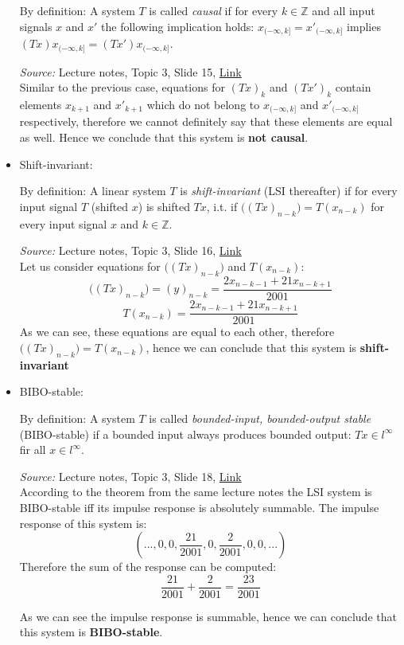\documentclass{article}
\begin{document}
\begin{itemize}
    By definition: A system $T$ is called \emph{causal} if for every $k\in \mathbb{Z}$ and all input signals $x$ and $x'$ the following implication holds: $x_{(-\infty,k]}=x'_{(-\infty,k]}$ implies $(Tx)x_{(-\infty,k]}=(Tx')x_{(-\infty,k]}$.
    
    \emph{Source:} Lecture notes, Topic 3, Slide 15, \href{https://moodle.innopolis.university/pluginfile.php/142933/mod_resource/content/1/DSPt3spr22.pdf}{Link}\\
    
    Similar to the previous case, equations for $(Tx)_k$ and $(Tx')_k$ contain elements $x_{k+1}$ and $x'_{k+1}$ which do not belong to $x_{(-\infty,k]}$ and $x'_{(-\infty,k]}$ respectively, therefore we cannot definitely say that these elements are equal as well. Hence we conclude that this system is \textbf{not causal}.
    
    \item Shift-invariant:
    
    By definition: A linear system $T$ is \emph{shift-invariant} (LSI thereafter) if for every input signal $T$ (shifted $x$) is shifted $Tx$, i.t. if $\big((Tx)_{n-k}\big)=T(x_{n-k})$ for every input signal $x$ and $k\in\mathbb{Z}$.
    
    \emph{Source:} Lecture notes, Topic 3, Slide 16, \href{https://moodle.innopolis.university/pluginfile.php/142933/mod_resource/content/1/DSPt3spr22.pdf}{Link}\\
    
    Let us consider equations for $\big((Tx)_{n-k}\big)$ and $T(x_{n-k})$:
    $$\big((Tx)_{n-k}\big)=(y)_{n-k}=\frac{2x_{n-k-1}+21x_{n-k+1}}{2001}$$
    $$T(x_{n-k})=\frac{2x_{n-k-1}+21x_{n-k+1}}{2001}$$
    As we can see, these equations are equal to each other, therefore $\big((Tx)_{n-k}\big)=T(x_{n-k})$, hence we can conclude that this system is \textbf{shift-invariant}
    
    \item BIBO-stable:
    
    By definition: A system $T$ is called \emph{ bounded-input, bounded-output stable} (BIBO-stable) if a bounded input always produces bounded output: $Tx\in l^{\infty}$ fir all $x\in l^{\infty}$.
    
    \emph{Source:} Lecture notes, Topic 3, Slide 18, \href{https://moodle.innopolis.university/pluginfile.php/142933/mod_resource/content/1/DSPt3spr22.pdf}{Link}\\
    
    According to the theorem from the same lecture notes the LSI system is BIBO-stable iff its impulse response is absolutely summable. The impulse response of this system is:
    $$(..., 0, 0, \frac{21}{2001}, 0, \frac{2}{2001}, 0, 0, ...)$$
    Therefore the sum of the response can be computed:
    $$\frac{21}{2001}+\frac{2}{2001}=\frac{23}{2001}$$
    
    As we can see the impulse response is summable, hence we can conclude that this system is \textbf{BIBO-stable}.
\end{itemize}
\end{document}
